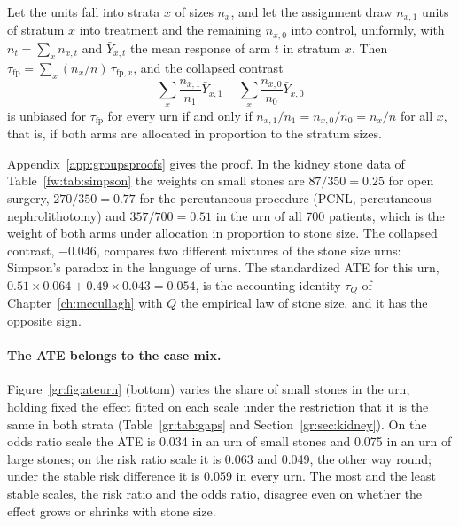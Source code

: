 \begin{proposition}\label{gr:prop:strat}
Let the units fall into strata $x$ of sizes $n_x$, and let the assignment draw $n_{x,1}$ units of stratum $x$ into treatment and the remaining $n_{x,0}$ into control, uniformly, with $n_t=\sum_xn_{x,t}$ and $\bar Y_{x,t}$ the mean response of arm $t$ in stratum $x$. Then $\tau_{\mathrm{fp}}=\sum_x(n_x/n)\,\tau_{\mathrm{fp},x}$, and the collapsed contrast
\[
\sum_x\frac{n_{x,1}}{n_1}\bar Y_{x,1}-\sum_x\frac{n_{x,0}}{n_0}\bar Y_{x,0}
\]
is unbiased for $\tau_{\mathrm{fp}}$ for every urn if and only if $n_{x,1}/n_1=n_{x,0}/n_0=n_x/n$ for all $x$, that is, if both arms are allocated in proportion to the stratum sizes.
\end{proposition}

Appendix~\ref{app:groupsproofs} gives the proof. In the kidney stone data of Table~\ref{fw:tab:simpson} the weights on small stones are $87/350=0.25$ for open surgery, $270/350=0.77$ for the percutaneous procedure (PCNL, percutaneous nephrolithotomy) and $357/700=0.51$ in the urn of all 700 patients, which is the weight of both arms under allocation in proportion to stone size. The collapsed contrast, $-0.046$, compares two different mixtures of the stone size urns: Simpson's paradox in the language of urns. The standardized ATE for this urn, $0.51\times0.064+0.49\times0.043=0.054$, is the accounting identity $\tau_Q$ of Chapter~\ref{ch:mccullagh} with $Q$ the empirical law of stone size, and it has the opposite sign.

\paragraph{The ATE belongs to the case mix.}  Figure~\ref{gr:fig:ateurn} (bottom) varies the share of small stones in the urn, holding fixed the effect fitted on each scale under the restriction that it is the same in both strata (Table~\ref{gr:tab:gaps} and Section~\ref{gr:sec:kidney}). On the odds ratio scale the ATE is 0.034 in an urn of small stones and 0.075 in an urn of large stones; on the risk ratio scale it is 0.063 and 0.049, the other way round; under the stable risk difference it is 0.059 in every urn. The most and the least stable scales, the risk ratio and the odds ratio, disagree even on whether the effect grows or shrinks with stone size.

